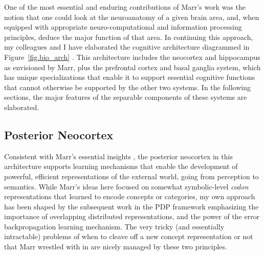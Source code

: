 \documentclass[11pt,twoside]{article}
\newif\myifpdf
\begin{document}
One of the most essential and enduring contributions of Marr's work was the notion that one could look at the neuroanatomy of a given brain area, and, when equipped with appropriate neuro-computational and information processing principles, deduce the major function of that area.  In continuing this approach, my colleagues and I have elaborated the cognitive architecture diagrammed in Figure~\ref{fig.bio_arch} \cite{OReillyMunakata00,OReillyMunakataFrankEtAl12,OReillyHazyHerd15}.  This architecture includes the neocortex and hippocampus as envisioned by Marr, plus the prefrontal cortex and basal ganglia system, which has unique specializations that enable it to support essential cognitive functions that cannot otherwise be supported by the other two systems.  In the following sections, the major features of the separable components of these systems are elaborated.

\subsection{Posterior Neocortex}

Consistent with Marr's essential insights \cite{Marr70}, the posterior neocortex in this architecture supports learning mechanisms that enable the development of powerful, efficient representations of the external world, going from perception to semantics.  While Marr's ideas here focused on somewhat symbolic-level {\em codon} representations that learned to encode concepts or categories, my own approach has been shaped by the subsequent work in the PDP framework \cite{RumelhartMcClellandthePDPResearchGroup86,McClellandRumelhartthePDPResearchGroup86} emphasizing the importance of overlapping distributed representations, and the power of the error backpropagation learning mechanism.  The very tricky (and essentially intractable) problems of when to cleave off a new concept representation or not that Marr wrestled with in  are nicely managed by these two principles.
\end{document}

